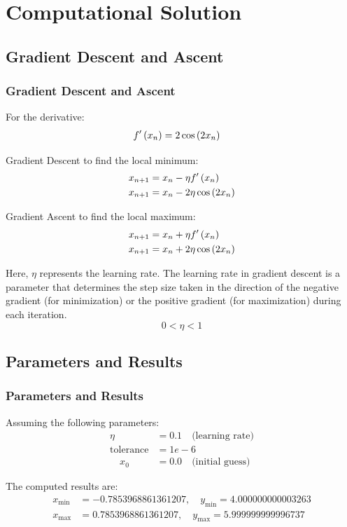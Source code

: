 \documentclass{beamer}
\numberwithin{equation}{section}
\begin{document}
\section{Computational Solution}
\subsection{Gradient Descent and Ascent}
\begin{frame}
\frametitle{Gradient Descent and Ascent}

For the derivative:
\begin{align}
    f^\prime\left(x_{n}\right) &= 2\cos{\ensuremath{\left(2x_{n}\right)}}
\end{align}

Gradient Descent to find the local minimum:
\begin{align}
    x_{n+1} &= x_{n} - \eta f^\prime\left(x_{n}\right) \\
    x_{n+1} &= x_{n} - 2\eta \cos{\ensuremath{\left(2x_{n}\right)}}
\end{align}

Gradient Ascent to find the local maximum:
\begin{align}
    x_{n+1} &= x_{n} + \eta f^\prime\left(x_{n}\right) \\
    x_{n+1} &= x_{n} + 2\eta \cos{\ensuremath{\left(2x_{n}\right)}}
\end{align}

Here, $\eta$ represents the learning rate. The learning rate in gradient descent is a parameter that determines the step size taken in the direction of the negative gradient (for minimization) or the positive gradient (for maximization) during each iteration. $$0 < \eta < 1$$
\end{frame}

\subsection{Parameters and Results}
\begin{frame}
\frametitle{Parameters and Results}

Assuming the following parameters:
\begin{align}
    \eta &= 0.1 \quad\text{(learning rate)} \\
    \text{tolerance} &= 1e-6 \\
    \quad x_{0} &= 0.0 \quad\text{(initial guess)}
\end{align}

The computed results are:
\begin{align}
    x_{\text{min}} &= -0.7853968861361207, \quad y_{\text{min}} = 4.000000000003263 \\
    x_{\text{max}} &= 0.7853968861361207, \quad y_{\text{max}} = 5.999999999996737
\end{align}
\end{frame}
\end{document}
